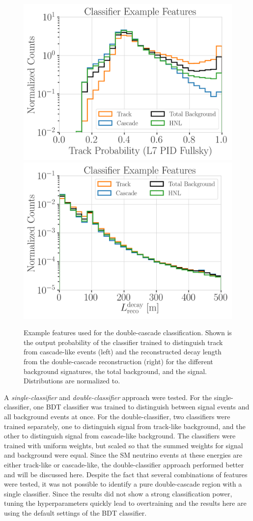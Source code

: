 \begin{figure}[h]
	\centering
    \includegraphics[width=0.49\linewidth]{figures/results/190607/classification/1_d_distr_L7_PIDClassifier_FullSky_ProbTrack_unweighted.png}
    \includegraphics[width=0.49\linewidth]{figures/results/190607/classification/1_d_distr_reco_decayL_unweighted.png}
    \caption[Double-cascade classification example features]{Example features used for the double-cascade classification. Shown is the output probability of the classifier trained to distinguish track from cascade-like events (left) and the reconstructed decay length from the double-cascade reconstruction (right) for the different background signatures, the total background, and the signal. Distributions are normalized to.}
\end{figure}

A \textit{single-classifier} and \textit{double-classifier} approach were tested. For the single-classifier, one BDT classifier was trained to distinguish between signal events and all background events at once. For the double-classifier, two classifiers were trained separately, one to distinguish signal from track-like background, and the other to distinguish signal from cascade-like background. The classifiers were trained with uniform weights, but scaled so that the summed weights for signal and background were equal. Since the SM neutrino events at these energies are either track-like or cascade-like, the double-classifier approach performed better and will be discussed here. Despite the fact that several combinations of features were tested, it was not possible to identify a pure double-cascade region with a single classifier. Since the results did not show a strong classification power, tuning the hyperparameters quickly lead to overtraining and the results here are using the default settings of the BDT classifier.


